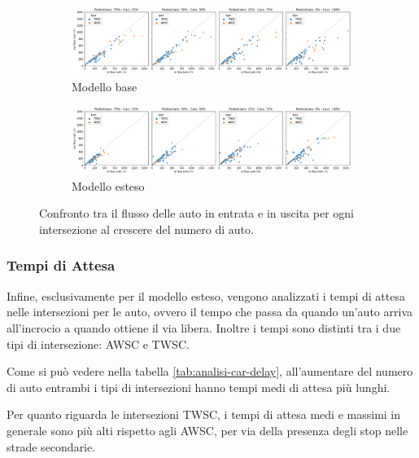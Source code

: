 \begin{figure}[ht]
    \centering
    \begin{subfigure}{\textwidth}
        \centering
        \includegraphics[width=\textwidth]{images/analisi/comparison-base-in-out-flow-car.png}
        \caption{Modello base}
    \end{subfigure}

    \begin{subfigure}{\textwidth}
        \centering
        \includegraphics[width=\textwidth]{images/analisi/comparison-new-in-out-flow-car.png}
        \caption{Modello esteso}
    \end{subfigure}
    \caption{
        Confronto tra il flusso delle auto in entrata e in uscita per ogni intersezione al crescere del numero di auto.
    }
    \label{fig:analisi-comparison-in-out-flow-car}
\end{figure}

\pagebreak


\subsubsection*{Tempi di Attesa}

Infine, esclusivamente per il modello esteso, vengono analizzati i tempi di attesa nelle intersezioni per le auto,
ovvero il tempo che passa da quando un'auto arriva all'incrocio a quando ottiene il via libera.
Inoltre i tempi sono distinti tra i due tipi di intersezione: AWSC e TWSC.

Come si può vedere nella tabella \ref{tab:analisi-car-delay}, all'aumentare del numero di auto entrambi i tipi di intersezioni
hanno tempi medi di attesa più lunghi.

Per quanto riguarda le intersezioni TWSC, i tempi di attesa medi e massimi in generale sono più alti rispetto agli AWSC,
per via della presenza degli stop nelle strade secondarie.

